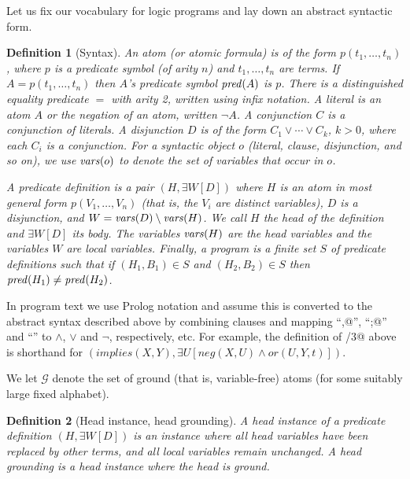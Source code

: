 \documentclass{tlp}
\newtheorem{definition}{Definition}
\newcommand{\ident}[1]{\mbox{\textit{#1}}}
\newcommand{\Her}{\mathcal{G}}
\begin{document}
Let us fix our vocabulary for logic programs and lay down
an abstract syntactic form.
\begin{definition}[Syntax] \rm
An atom (or atomic formula) is of the form
$p(t_1,\ldots,t_n)$, where $p$ is a predicate symbol (of arity $n$)
and $t_1,\ldots,t_n$ are terms.
If $A = p(t_1,\ldots,t_n)$ then $A$'s predicate symbol $\ident{pred}(A)$
is $p$.
There is a distinguished equality predicate $=$ with arity 2, written
using infix notation.
A \emph{literal} is an \emph{atom} $A$ or the negation of an atom,
written $\lnot A$.
A \emph{conjunction} $C$ is a conjunction of literals.
A \emph{disjunction} $D$ is of the form $C_1 \lor \cdots \lor C_k$, 
$k>0$, where each $C_i$ is a conjunction.
For a syntactic object $o$ (literal, clause, disjunction, and so on),
we use $\ident{vars}(o)$ to denote the set of variables that occur
in $o$.

A \emph{predicate definition} is a pair $(H, \exists W[D])$ 
where $H$ is an atom in most general form $p(V_1,\ldots,V_n)$ 
(that is, the $V_i$ are distinct variables), 
$D$ is a disjunction, 
and $W = \ident{vars}(D) \setminus \ident{vars}(H)$.
We call $H$ the \emph{head} of the definition and $\exists W[D]$
its \emph{body}.
The variables $\ident{vars}(H)$ are the \emph{head variables} 
and the variables $W$ are \emph{local variables}.
Finally, a \emph{program} is a finite set $S$ of predicate definitions 
such that if $(H_1,B_1) \in S$ and $(H_2,B_2) \in S$ then 
$\ident{pred}(H_1) \not= \ident{pred}(H_2)$.
\end{definition}

In program text we use Prolog notation and assume this is
converted to the abstract syntax described above by combining
clauses and mapping ``\verb@,@'', ``\verb@;@'' and ``\verb@not@'' to
$\land$, $\lor$ and $\lnot$, respectively, etc.  For example, the
definition of \verb@implies/3@ above is shorthand for
$(implies(X, Y), \exists U [ neg(X, U) \land or(U, Y, t)])$.

We let $\Her$ denote the set of ground (that is, variable-free)
atoms (for some suitably large fixed alphabet).

\begin{definition}[Head instance, head grounding] \rm
\label{def-headinstance}
A \emph{head instance} of a predicate definition $(H,\exists W[D])$
is an instance where all head variables have been replaced by other
terms, and all local variables remain unchanged.
A \emph{head grounding} is a head instance where the head is ground.
\end{definition}
\end{document}

